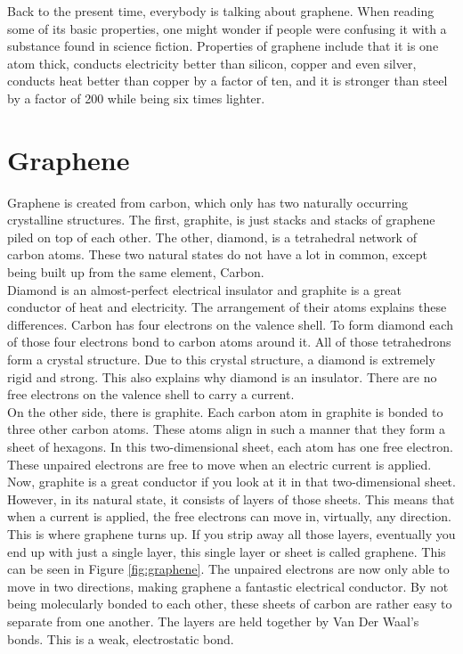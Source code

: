 \documentclass[conference, 10pt]{IEEEtran}
\begin{document}
Back to the present time, everybody is talking about graphene. When reading some of its basic properties, one might wonder if people were confusing it with a substance found in science fiction. Properties of graphene include that it is one atom thick, conducts electricity better than silicon, copper and even silver, conducts heat better than copper by a factor of ten, and it is stronger than steel by a factor of 200 while being six times lighter. \cite{graphene}\\


\section{Graphene}

Graphene is created from carbon, which only has two naturally occurring crystalline structures. The first, graphite, is just stacks and stacks of graphene piled on top of each other. The other, diamond, is a tetrahedral network of carbon atoms. These two natural states do not have a lot in common, except being built up from the same element, Carbon.\cite{graphene}\\

Diamond is an almost-perfect electrical insulator and graphite is a great conductor of heat and electricity. The arrangement of their atoms explains these differences. Carbon has four electrons on the valence shell. To form diamond each of those four electrons bond to carbon atoms around it. All of those tetrahedrons form a crystal structure. Due to this crystal structure, a diamond is extremely rigid and strong. This also explains why diamond is an insulator. There are no free electrons on the valence shell to carry a current.\cite{graphene}\\

On the other side, there is graphite. Each carbon atom in graphite is bonded to three other carbon atoms. These atoms align in such a manner that they form a sheet of hexagons. In this two-dimensional sheet, each atom has one free electron. These unpaired electrons are free to move when an electric current is applied. Now, graphite is a great conductor if you look at it in that two-dimensional sheet. However, in its natural state, it consists of layers of those sheets. This means that when a current is applied, the free electrons can move in, virtually, any direction. \cite{graphene}\\

This is where graphene turns up. If you strip away all those layers, eventually you end up with just a single layer, this single layer or sheet is called graphene. This can be seen in Figure \ref{fig:graphene}. The unpaired electrons are now only able to move in two directions, making graphene a fantastic electrical conductor. By not being molecularly bonded to each other, these sheets of carbon are rather easy to separate from one another. The layers are held together by Van Der Waal's bonds. This is a weak, electrostatic bond. \cite{graphene}
\end{document}
